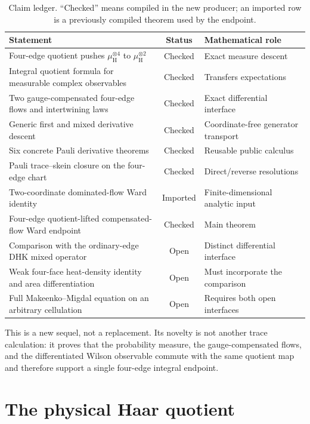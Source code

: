 \documentclass[11pt]{article}
\theoremstyle{definition}
\newcommand{\Haar}{\mu_{\mathrm H}}
\begin{document}
\begin{table}[ht]
\centering\small
\caption{Claim ledger. ``Checked'' means compiled in the new producer; an
imported row is a previously compiled theorem used by the endpoint.}
\label{tab:scope}
\begin{tabularx}{\textwidth}{@{}>{\raggedright\arraybackslash}X c
 >{\raggedright\arraybackslash}p{}@{}}
\toprule
Statement & Status & Mathematical role \\
\midrule
Four-edge quotient pushes $\Haar^{\otimes4}$ to $\Haar^{\otimes2}$
 & Checked & Exact measure descent \\
Integral quotient formula for measurable complex observables
 & Checked & Transfers expectations \\
Two gauge-compensated four-edge flows and intertwining laws
 & Checked & Exact differential interface \\
Generic first and mixed derivative descent
 & Checked & Coordinate-free generator transport \\
Six concrete Pauli derivative theorems
 & Checked & Reusable public calculus \\
Pauli trace--skein closure on the four-edge chart
 & Checked & Direct/reverse resolutions \\
Two-coordinate dominated-flow Ward identity
 & Imported & Finite-dimensional analytic input \\
Four-edge quotient-lifted compensated-flow Ward endpoint
 & Checked & Main theorem \\
Comparison with the ordinary-edge DHK mixed operator
 & Open & Distinct differential interface \\
Weak four-face heat-density identity and area differentiation
 & Open & Must incorporate the comparison \\
Full Makeenko--Migdal equation on an arbitrary cellulation
 & Open & Requires both open interfaces \\
\bottomrule
\end{tabularx}
\end{table}

This is a new sequel, not a replacement.  Its novelty is not another trace
calculation: it proves that the probability measure, the gauge-compensated
flows, and the differentiated Wilson observable commute with the same
quotient map and therefore support a single four-edge integral endpoint.

\section{The physical Haar quotient}
\end{document}

